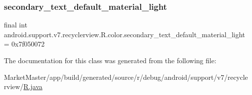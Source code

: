 \mbox{\label{classandroid_1_1support_1_1v7_1_1recyclerview_1_1R_1_1color_ad9cb37541085c24dce097ad0d62c44f0}} 
\subsubsection{\texorpdfstring{secondary\+\_\+text\+\_\+default\+\_\+material\+\_\+light}{secondary\_text\_default\_material\_light}}
{\footnotesize\ttfamily final int android.\+support.\+v7.\+recyclerview.\+R.\+color.\+secondary\+\_\+text\+\_\+default\+\_\+material\+\_\+light = 0x7f050072\hspace{0.3cm}{\ttfamily [static]}}



The documentation for this class was generated from the following file\+:\begin{DoxyCompactItemize}
\item 
Market\+Master/app/build/generated/source/r/debug/android/support/v7/recyclerview/\mbox{\hyperlink{debug_2android_2support_2v7_2recyclerview_2R_8java}{R.\+java}}\end{DoxyCompactItemize}
